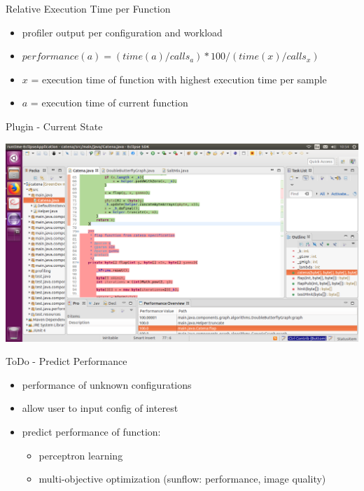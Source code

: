 \documentclass[11pt,aspectratio=169]{beamer}
\begin{document}
\begin{frame}{Relative Execution Time per Function}
  \begin{itemize}
    \item profiler output per configuration and workload
    \item $performance(a) = (time(a)/calls_a)*100/(time(x)/calls_x)$
    \item $x$ = execution time of function with highest execution time per sample
    \item $a$ = execution time of current function
  \end{itemize}
\end{frame}


\begin{frame}{Plugin - Current State}
  \begin{center}
    \includegraphics[height=0.83\textheight]{./images/catena_max_all_cfgs}
  \end{center}
\end{frame}


\begin{frame}{ToDo - Predict Performance}
  \begin{itemize}
    \item performance of unknown configurations
    \item allow user to input config of interest
    \item predict performance of function:
    \begin{itemize}
      \item perceptron learning
      \item multi-objective optimization (sunflow: performance, image quality)
    \end{itemize}
  \end{itemize}
\end{frame}
\end{document}
